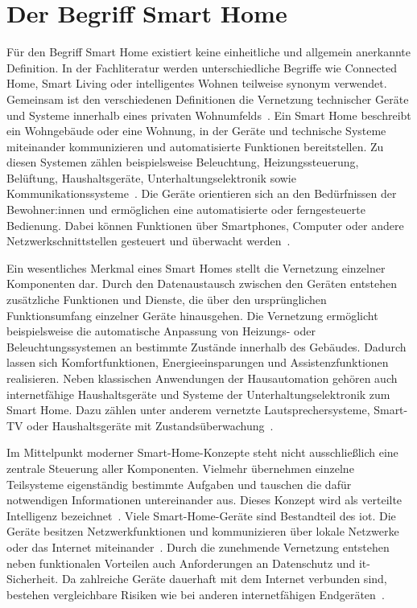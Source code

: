 \section{Der Begriff Smart Home}
Für den Begriff Smart Home existiert keine einheitliche und allgemein anerkannte Definition.  
In der Fachliteratur werden unterschiedliche Begriffe wie Connected Home, Smart Living oder intelligentes Wohnen teilweise synonym verwendet.  
Gemeinsam ist den verschiedenen Definitionen die Vernetzung technischer Geräte und Systeme innerhalb eines privaten Wohnumfelds~\cite{Q2,Q3}.
Ein Smart Home beschreibt ein Wohngebäude oder eine Wohnung, in der Geräte und technische Systeme miteinander kommunizieren und automatisierte Funktionen bereitstellen.  
Zu diesen Systemen zählen beispielsweise Beleuchtung, Heizungssteuerung, Belüftung, Haushaltsgeräte, Unterhaltungselektronik sowie Kommunikationssysteme~\cite{Q1,Q2,Q3}.
Die Geräte orientieren sich an den Bedürfnissen der Bewohner:innen und ermöglichen eine automatisierte oder ferngesteuerte Bedienung.   
Dabei können Funktionen über Smartphones, Computer oder andere Netzwerkschnittstellen gesteuert und überwacht werden~\cite{Q1,Q3}.

Ein wesentliches Merkmal eines Smart Homes stellt die Vernetzung einzelner Komponenten dar.  
Durch den Datenaustausch zwischen den Geräten entstehen zusätzliche Funktionen und Dienste, die über den ursprünglichen Funktionsumfang einzelner Geräte hinausgehen.
Die Vernetzung ermöglicht beispielsweise die automatische Anpassung von Heizungs- oder Beleuchtungssystemen an bestimmte Zustände innerhalb des Gebäudes.  
Dadurch lassen sich Komfortfunktionen, Energieeinsparungen und Assistenzfunktionen realisieren.
Neben klassischen Anwendungen der Hausautomation gehören auch internetfähige Haushaltsgeräte und Systeme der Unterhaltungselektronik zum Smart Home.  
Dazu zählen unter anderem vernetzte Lautsprechersysteme, Smart-TV oder Haushaltsgeräte mit Zustandsüberwachung~\cite{Q1,Q2}.

Im Mittelpunkt moderner Smart-Home-Konzepte steht nicht ausschließlich eine zentrale Steuerung aller Komponenten.  
Vielmehr übernehmen einzelne Teilsysteme eigenständig bestimmte Aufgaben und tauschen die dafür notwendigen Informationen untereinander aus.  
Dieses Konzept wird als verteilte Intelligenz bezeichnet~\cite{Q2}. 
Viele Smart-Home-Geräte sind Bestandteil des \gls{iot}.  
Die Geräte besitzen Netzwerkfunktionen und kommunizieren über lokale Netzwerke oder das Internet miteinander~\cite{Q1,Q3}.
Durch die zunehmende Vernetzung entstehen neben funktionalen Vorteilen auch Anforderungen an Datenschutz und \gls{it}-Sicherheit.  
Da zahlreiche Geräte dauerhaft mit dem Internet verbunden sind, bestehen vergleichbare Risiken wie bei anderen internetfähigen Endgeräten~\cite{Q1}.

